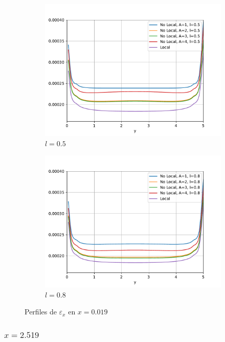 \begin{figure}
\begin{subfigure}{0.48\textwidth}
		    \centering
		        \includegraphics[width=\textwidth]{figuras/Placa/Perfiles/X/X0.5_0.019.pdf}
		        \caption{$l=0.5$}
		        \label{fig:perfilesX0019.05}
		    \end{subfigure}
		    \begin{subfigure}{0.48\textwidth}
		    \centering
		        \includegraphics[width=\textwidth]{figuras/Placa/Perfiles/X/X0.8_0.019.pdf}
		        \caption{$l=0.8$}
		        \label{fig:perfilesX0019.08}
		    \end{subfigure}
		    \caption{Perfiles de $\varepsilon_x$ en $x=0.019$}
		    \label{fig:perfilesX0019}
		\end{figure}

	\subsubsection{\texorpdfstring{$x=2.519$}{x=2.519}}


